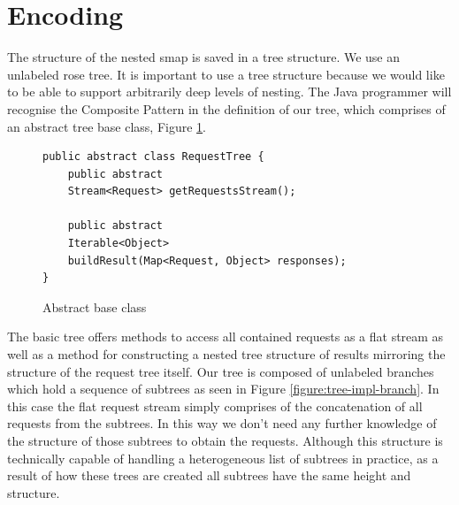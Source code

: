 \section{Encoding}

The structure of the nested smap is saved in a tree structure.
We use an unlabeled rose tree\cite{MALCOLM1990255}.
It is important to use a tree structure because we would like to be able to support arbitrarily deep levels of nesting.
The Java programmer will recognise the Composite Pattern in the definition of our tree, which comprises of an abstract tree base class, Figure \ref{figure:tree-impl-base-class}.

\begin{figure}

\begin{verbatim}
public abstract class RequestTree {
    public abstract
    Stream<Request> getRequestsStream();

    public abstract
    Iterable<Object>
    buildResult(Map<Request, Object> responses);
}
\end{verbatim}
\caption{Abstract base class}
\label{figure:tree-impl-base-class}

\end{figure}

The basic tree offers methods to access all contained requests as a flat stream as well as a method for constructing a nested tree structure of results mirroring the structure of the request tree itself.
Our tree is composed of unlabeled branches which hold a sequence of subtrees as seen in Figure \ref{figure:tree-impl-branch}.
In this case the flat request stream simply comprises of the concatenation of all requests from the subtrees.
In this way we don't need any further knowledge of the structure of those subtrees to obtain the requests.
Although this structure is technically capable of handling a heterogeneous list of subtrees in practice, as a result of how these trees are created all subtrees have the same height and structure.

